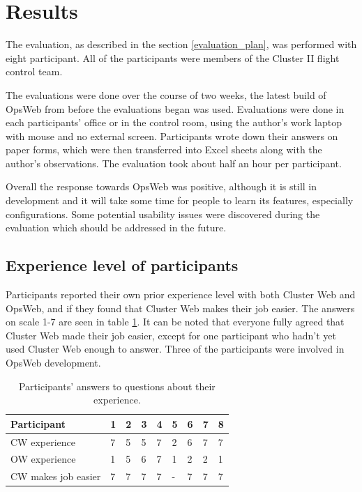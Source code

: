 \section{Results}
The evaluation, as described in the section \ref{evaluation_plan}, was performed with eight participant. All of the participants were members of the Cluster II flight control team.

The evaluations were done over the course of two weeks, the latest build of OpsWeb from before the evaluations began was used. Evaluations were done in each participants' office or in the control room, using the author's work laptop with mouse and no external screen. Participants wrote down their answers on paper forms, which were then transferred into Excel sheets along with the author's observations. The evaluation took about half an hour per participant.

Overall the response towards OpsWeb was positive, although it is still in development and it will take some time for people to learn its features, especially configurations. Some potential usability issues were discovered during the evaluation which should be addressed in the future.

\subsection{Experience level of participants}
Participants reported their own prior experience level with both Cluster Web and OpsWeb, and if they found that Cluster Web makes their job easier. The answers on scale 1-7 are seen in table \ref{experience_levels}. It can be noted that everyone fully agreed that Cluster Web made their job easier, except for one participant who hadn't yet used Cluster Web enough to answer. Three of the participants were involved in OpsWeb development.

\begin{table}[!ht]
\def\arraystretch{1.1}%
    \begin{center}
    \caption{Participants' answers to questions about their experience.}
    \label{experience_levels}
    \begin{tabular}{| l | l | l | l | l | l | l | l | l | }
    \hline
    Participant & 1 & 2 & 3 & 4 & 5 & 6 & 7 & 8   \\
    \hline
    CW experience    & 7  & 5 & 5 & 7 & 2 & 6 & 7 & 7     \\
    OW experience    & 1 & 5 & 6 & 7 & 1 & 2 & 2 & 1  \\
    CW makes job easier & 7 & 7 & 7 & 7 & - & 7 & 7 & 7    \\
    \hline
    \end{tabular}
    \end{center}
\end{table}

